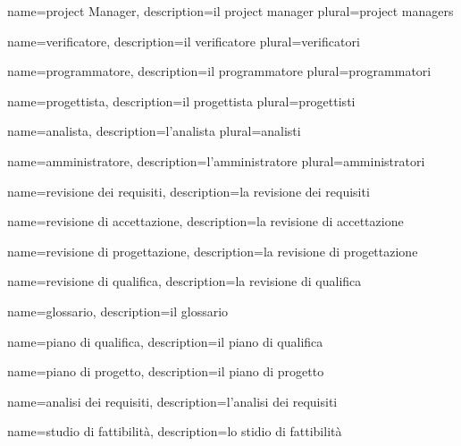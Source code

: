 \makeglossary

 {
	name=project Manager,
	description={il project manager \TODO{}}
	plural=project managers
}

 {
	name=verificatore,
	description={il verificatore \TODO{}}
	plural=verificatori
}

 {
	name=programmatore,
	description={il programmatore \TODO{}}
	plural=programmatori
}

 {
	name=progettista,
	description={il progettista \TODO{}}
	plural=progettisti
}

 {
	name=analista,
	description={l'analista \TODO{}}
	plural=analisti
}

 {
	name=amministratore,
	description={l'amministratore \TODO{}}
	plural=amministratori
}

 {
	name=revisione dei requisiti,
	description={la revisione dei requisiti \TODO{}}
}

 {
	name=revisione di accettazione,
	description={la revisione di accettazione \TODO{}}
}

 {
	name=revisione di progettazione,
	description={la revisione di progettazione \TODO{}}
}

 {
	name=revisione di qualifica,
	description={la revisione di qualifica \TODO{}}
}

 {
	name=glossario,
	description={il glossario \TODO{}}
}

 {
	name=piano di qualifica,
	description={il piano di qualifica \TODO{}}
}

 {
	name=piano di progetto,
	description={il piano di progetto \TODO{}}
}

 {
	name=analisi dei requisiti,
	description={l'analisi dei requisiti \TODO{}}
}

 {
	name=studio di fattibilità,
	description={lo stidio di fattibilità \TODO{}}
}

